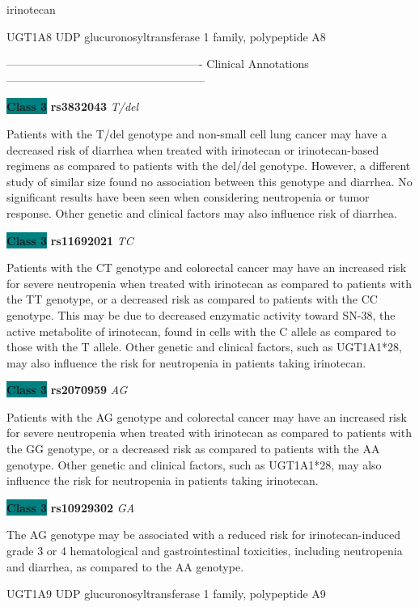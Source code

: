 \documentclass{resume} %
\begin{document}
\begin{rSection}{ irinotecan }
\begin{rSubsection}{ UGT1A8 }{ UDP glucuronosyltransferase 1 family, polypeptide A8 }{}{}
\item[] ---------------------------------------------------- Clinical Annotations -----------------------------------------------------\newline
\item \textbf{\colorbox{teal} {Class 3}} \textbf{ rs3832043 } \textit{ T/del }
\item[] Patients with the T/del genotype and non-small cell lung cancer may have a decreased risk of diarrhea when treated with irinotecan or irinotecan-based regimens as compared to patients with the del/del genotype. However, a different study of similar size found no association between this genotype and diarrhea. No significant results have been seen when considering neutropenia or tumor response. Other genetic and clinical factors may also influence risk of diarrhea.\item \textbf{\colorbox{teal} {Class 3}} \textbf{ rs11692021 } \textit{ TC }
\item[] Patients with the CT genotype and colorectal cancer may have an increased risk for severe neutropenia when treated with irinotecan as compared to patients with the TT genotype, or a decreased risk as compared to patients with the CC genotype. This may be due to decreased enzymatic activity toward SN-38, the active metabolite of irinotecan, found in cells with the C allele as compared to those with the T allele. Other genetic and clinical factors, such as UGT1A1*28, may also influence the risk for neutropenia in patients taking irinotecan.\item \textbf{\colorbox{teal} {Class 3}} \textbf{ rs2070959 } \textit{ AG }
\item[] Patients with the AG genotype and colorectal cancer may have an increased risk for severe neutropenia when treated with irinotecan as compared to patients with the GG genotype, or a decreased risk as compared to patients with the AA genotype. Other genetic and clinical factors, such as UGT1A1*28, may also influence the risk for neutropenia in patients taking irinotecan.\item \textbf{\colorbox{teal} {Class 3}} \textbf{ rs10929302 } \textit{ GA }
\item[] The AG genotype may be associated with a reduced risk for irinotecan-induced grade 3 or 4 hematological and gastrointestinal toxicities, including neutropenia and diarrhea, as compared to the AA genotype. 
\end{rSubsection}\begin{rSubsection}{ UGT1A9 }{ UDP glucuronosyltransferase 1 family, polypeptide A9 }{}{}
\item[]


\end{rSubsection}
\end{rSection}
\end{document}
